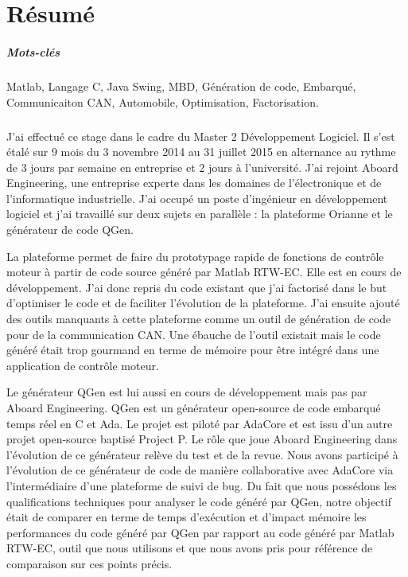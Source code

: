 \chapter*{Résumé}

\paragraph*{Mots-clés}
Matlab, Langage C, Java Swing, MBD, Génération de code, Embarqué, Communicaiton
CAN, Automobile, Optimisation, Factorisation.

\paragraph*{}
J'ai effectué ce stage dans le cadre du Master 2 Développement Logiciel. Il
s'est étalé sur 9 mois du 3 novembre 2014 au 31 juillet 2015 en alternance au
rythme de 3 jours par semaine en entreprise et 2 jours à l'université. J'ai
rejoint Aboard Engineering, une entreprise experte dans les domaines de
l'électronique et de l'informatique industrielle. J'ai occupé un poste
d'ingénieur en développement logiciel et j'ai travaillé sur deux sujets en
parallèle : la plateforme Orianne et le générateur de code QGen.

La plateforme permet de faire du prototypage rapide de fonctions de contrôle
moteur à partir de code source généré par Matlab\up{\circledR}
RTW-EC\up{\circledR}. Elle est en cours de développement. J'ai donc repris du
code existant que j'ai factorisé dans le but d'optimiser le code et de faciliter
l'évolution de la plateforme.
J'ai ensuite ajouté des outils manquants à cette plateforme comme un outil de
génération de code pour de la communication CAN. Une ébauche de l'outil existait
mais le code généré était trop gourmand en terme de mémoire pour être intégré
dans une application de contrôle moteur.

Le générateur QGen est lui aussi en cours de développement mais pas par Aboard
Engineering. QGen est un générateur open-source de code embarqué temps réel en C
et Ada. Le projet est piloté par AdaCore et est issu d'un autre projet
open-source baptisé Project P. Le rôle que joue Aboard Engineering dans
l'évolution de ce générateur relève du test et de la revue. Nous avons
participé à l'évolution de ce générateur de code de manière collaborative avec
AdaCore via l'intermédiaire d'une plateforme de suivi de bug. Du fait que nous
possédons les qualifications techniques pour analyser le code généré par QGen,
notre objectif était de comparer en terme de temps d'exécution et d'impact
mémoire les performances du code généré par QGen par rapport au code généré par
Matlab\up{\circledR} RTW-EC\up{\circledR}, outil que nous utilisons et que nous
avons pris pour référence de comparaison sur ces points précis.

